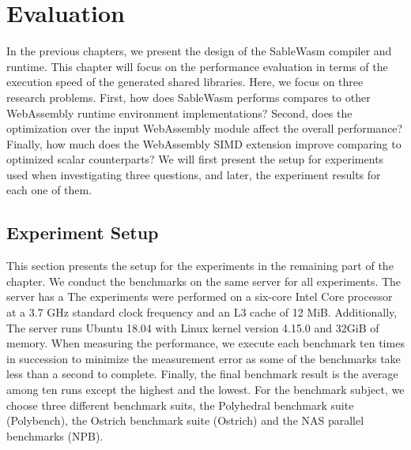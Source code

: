 \chapter{Evaluation}

In the previous chapters, we present the design of the SableWasm compiler and runtime. This chapter will focus on the performance evaluation in terms of the execution speed of the generated shared libraries. Here, we focus on three research problems. First, how does SableWasm performs compares to other WebAssembly runtime environment implementations? Second, does the optimization over the input WebAssembly module affect the overall performance? Finally, how much does the WebAssembly SIMD extension improve comparing to optimized scalar counterparts? We will first present the setup for experiments used when investigating three questions, and later, the experiment results for each one of them.

\section{Experiment Setup}

This section presents the setup for the experiments in the remaining part of the chapter. We conduct the benchmarks on the same server for all experiments. The server has a The experiments were performed on a six-core Intel Core processor at a 3.7 GHz standard clock frequency and an L3 cache of 12 MiB. Additionally, The server runs Ubuntu 18.04 with Linux kernel version 4.15.0 and 32GiB of memory. When measuring the performance, we execute each benchmark ten times in succession to minimize the measurement error as some of the benchmarks take less than a second to complete. Finally, the final benchmark result is the average among ten runs except the highest and the lowest. For the benchmark subject, we choose three different benchmark suits, the Polyhedral benchmark suite (Polybench), the Ostrich benchmark suite (Ostrich) and the NAS parallel benchmarks (NPB).

